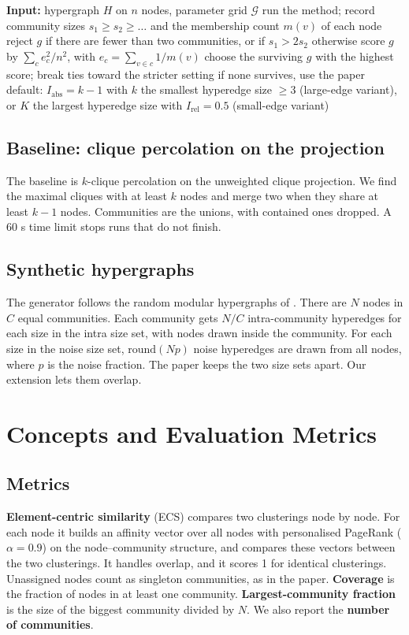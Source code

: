 \documentclass[11pt,a4paper]{article}
\newcommand{\Iabs}{I_{\mathrm{abs}}}
\newcommand{\Irel}{I_{\mathrm{rel}}}
\begin{document}
\begin{algorithm}[t]
\caption{Label-free parameter selection}\label{alg:rule}
\begin{algorithmic}[1]
\STATE \textbf{Input:} hypergraph $H$ on $n$ nodes, parameter grid $\mathcal{G}$
  \STATE run the method; record community sizes $s_1 \ge s_2 \ge \dots$ and the membership count $m(v)$ of each node
  \STATE reject $g$ if there are fewer than two communities, or if $s_1 > 2 s_2$
  \STATE otherwise score $g$ by $\sum_c e_c^2 / n^2$, with $e_c = \sum_{v \in c} 1/m(v)$
\ENDFOR
\STATE choose the surviving $g$ with the highest score; break ties toward the stricter setting
\STATE if none survives, use the paper default: $\Iabs = k-1$ with $k$ the smallest hyperedge size $\ge 3$ (large-edge variant), or $K$ the largest hyperedge size with $\Irel = 0.5$ (small-edge variant)
\end{algorithmic}
\end{algorithm}

\subsection{Baseline: clique percolation on the projection}
The baseline is $k$-clique percolation on the unweighted clique projection. We find the maximal cliques with at least $k$ nodes and merge two when they share at least $k-1$ nodes. Communities are the unions, with contained ones dropped. A 60 s time limit stops runs that do not finish.

\subsection{Synthetic hypergraphs}
The generator follows the random modular hypergraphs of \cite{kovacs2025}. There are $N$ nodes in $C$ equal communities. Each community gets $N/C$ intra-community hyperedges for each size in the intra size set, with nodes drawn inside the community. For each size in the noise size set, $\mathrm{round}(Np)$ noise hyperedges are drawn from all nodes, where $p$ is the noise fraction. The paper keeps the two size sets apart. Our extension lets them overlap.

\section{Concepts and Evaluation Metrics}
\subsection{Metrics}
\textbf{Element-centric similarity} (ECS) \cite{gates2019} compares two clusterings node by node. For each node it builds an affinity vector over all nodes with personalised PageRank ($\alpha = 0.9$) on the node--community structure, and compares these vectors between the two clusterings. It handles overlap, and it scores 1 for identical clusterings. Unassigned nodes count as singleton communities, as in the paper. \textbf{Coverage} is the fraction of nodes in at least one community. \textbf{Largest-community fraction} is the size of the biggest community divided by $N$. We also report the \textbf{number of communities}.
\end{document}
